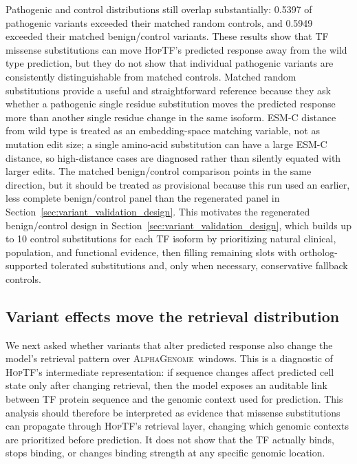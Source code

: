 \documentclass[11pt]{article}
\newcommand{\hoptf}{\textsc{HopTF}}
\newcommand{\ag}{\textsc{AlphaGenome}}
\begin{document}
Pathogenic and control distributions still overlap substantially: 0.5397 of pathogenic variants exceeded their matched random controls, and 0.5949 exceeded their matched benign/control variants. These results show that TF missense substitutions can move \hoptf's predicted response away from the wild type prediction, but they do not show that individual pathogenic variants are consistently distinguishable from matched controls. Matched random substitutions provide a useful and straightforward reference because they ask whether a pathogenic single residue substitution moves the predicted response more than another single residue change in the same isoform. ESM-C distance from wild type is treated as an embedding-space matching variable, not as mutation edit size; a single amino-acid substitution can have a large ESM-C distance, so high-distance cases are diagnosed rather than silently equated with larger edits. The matched benign/control comparison points in the same direction, but it should be treated as provisional because this run used an earlier, less complete benign/control panel than the regenerated panel in Section~\ref{sec:variant_validation_design}. This motivates the regenerated benign/control design in Section~\ref{sec:variant_validation_design}, which builds up to 10 control substitutions for each TF isoform by prioritizing natural clinical, population, and functional evidence, then filling remaining slots with ortholog-supported tolerated substitutions and, only when necessary, conservative fallback controls.

\subsection{Variant effects move the retrieval distribution}

We next asked whether variants that alter predicted response also change the model's retrieval pattern over \ag\ windows. This is a diagnostic of \hoptf's intermediate representation: if sequence changes affect predicted cell state only after changing retrieval, then the model exposes an auditable link between TF protein sequence and the genomic context used for prediction. This analysis should therefore be interpreted as evidence that missense substitutions can propagate through \hoptf's retrieval layer, changing which genomic contexts are prioritized before prediction. It does not show that the TF actually binds, stops binding, or changes binding strength at any specific genomic location.
\end{document}
